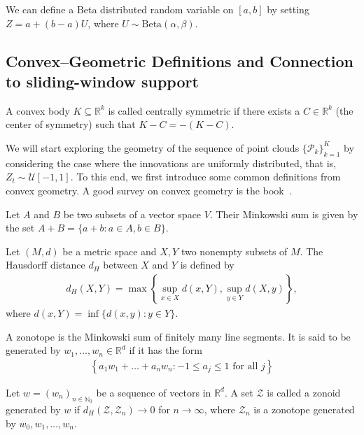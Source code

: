 We can define a Beta distributed random variable on $[a,b]$ by setting $Z=a+(b-a)U$, where $U\sim\text{Beta}(\alpha,\beta)$.

\subsection{Convex--Geometric Definitions and Connection to sliding-window support}

A convex body $K\subseteq\mathbb{R}^k$ is called centrally symmetric if there exists a $C\in\mathbb{R}^{k}$ (the center of symmetry) such that $K-C=-(K-C)$.

We will start exploring the geometry of the sequence of point clouds $\{\mathcal{P}_k\}_{k=1}^{K}$ by considering the case where the innovations are uniformly distributed, that is, $Z_t\sim\mathcal{U}[-1,1]$. To this end, we first introduce some common definitions from convex geometry. A good survey on convex geometry is the book~\cite{gruber1993handbook}.

\begin{Def}
    Let $A$ and $B$ be two subsets of a vector space $V$. Their Minkowski sum is given by the set $A+B=\{a+b:a\in A,b\in B\}$.
\end{Def}

\begin{Def}
    Let $(M,d)$ be a metric space and $X,Y$ two nonempty subsets of $M$. The Hausdorff distance $d_H$ between $X$ and $Y$ is defined by
    \begin{align*}
        d_H(X,Y)=\max\left\{\sup_{x\in X}d(x,Y),\sup_{y\in Y}d(X,y)\right\},
    \end{align*}
    where $d(x,Y)=\inf\{d(x,y):y\in Y\}$.
\end{Def}

\begin{Def}[Zonotope]
    A zonotope is the Minkowski sum of finitely many line segments. It is said to be generated by $w_1,\dots,w_n\in\mathbb{R}^d$ if it has the form
    \begin{align*}
        \left\{a_1w_1+\dots+a_nw_n:-1\le a_j\le 1\text{ for all }j\right\}
    \end{align*}
\end{Def}

\begin{Def}[Zonoid]\label{def:zonoid}
    Let $w=(w_n)_{n\in\mathbb{N}_0}$ be a sequence of vectors in $\mathbb{R}^d$. A set $\mathcal{Z}$ is called a zonoid generated by $w$ if $d_H(\mathcal{Z},\mathcal{Z}_n)\to0$ for $n\to\infty$, where $\mathcal{Z}_n$ is a zonotope generated by $w_0,w_1,\dots,w_n$.
\end{Def}

